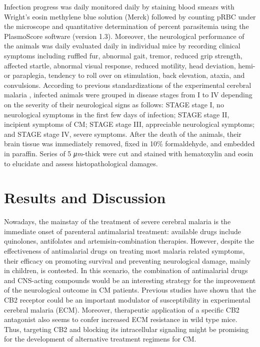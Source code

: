 \documentclass[empirical, authordate]{jote-new-article}
\begin{document}
Infection progress was daily monitored daily by staining blood smears with Wright's eosin methylene blue solution (Merck) followed by counting pRBC under the microscope and quantitative determination of percent parasitemia using the PlasmoScore software (version 1.3). Moreover, the neurological performance of the animals was daily evaluated daily in individual mice by recording clinical symptoms including ruffled fur, abnormal gait, tremor, reduced grip strength, affected startle, abnormal visual response, reduced motility, head deviation, hemi- or paraplegia, tendency to roll over on stimulation, back elevation, ataxia, and convulsions. According to previous standardizations of the experimental cerebral malaria \parencite{Martinez2013, Linares2013}, infected animals were grouped in disease stages from I to IV depending on the severity of their neurological signs as follows: STAGE stage I, no neurological symptoms in the first few days of infection; STAGE stage II, incipient symptoms of CM; STAGE stage III, appreciable neurological symptoms; and STAGE stage IV, severe symptoms. After the death of the animals, their brain tissue was immediately removed, fixed in 10\% formaldehyde, and embedded in paraffin. Series of 5 \emph{μm}-thick were cut and stained with hematoxylin and eosin to elucidate and assess histopathological damages.


\section{Results and Discussion}

\begin{originalPurpose}
  Nowadays, the mainstay of the treatment of severe cerebral malaria is the immediate onset of parenteral antimalarial treatment: available drugs include quinolones, antifolates and artemisin-combination therapies. However, despite the effectiveness of antimalarial drugs on treating most malaria related symptoms, their efficacy on promoting survival and preventing neurological damage, mainly in children, is contested. In this scenario, the combination of antimalarial drugs and CNS-acting compounds would be an interesting strategy for the improvement of the neurological outcome in CM patients. Previous studies have shown that the CB2 receptor could be an important modulator of susceptibility in experimental cerebral malaria (ECM). Moreover, therapeutic application of a specific CB2 antagonist also seems to confer increased ECM resistance in wild type mice. Thus, targeting CB2 and blocking its intracellular signaling might be promising for the development of alternative treatment regimens for CM.
\end{originalPurpose}
\end{document}
